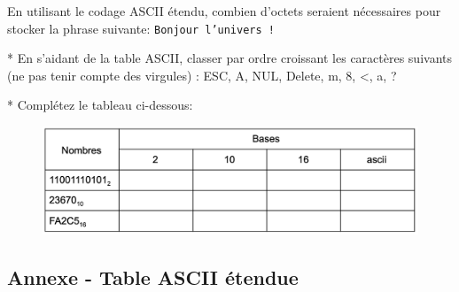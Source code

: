 \documentclass[11pt, a4paper]{book}
\begin{document}
\begin{exercice}
    En utilisant le codage ASCII étendu, combien d'octets seraient nécessaires pour stocker la phrase suivante:  \texttt{Bonjour l’univers !}
\end{exercice}

\begin{exercice}
* En s’aidant de la table ASCII, classer par ordre croissant les caractères suivants (ne pas tenir compte des virgules) : ESC, A, NUL, Delete, m, 8, <, a, ?
\end{exercice}


\begin{exercice}
* Complétez le tableau ci-dessous:

\begin{figure}[h!]
\begin{center}
\includegraphics[scale=.25]{images/tableauconversion}
\end{center}
\end{figure}
\end{exercice}

\subsection{Annexe - Table ASCII étendue}

\end{document}
